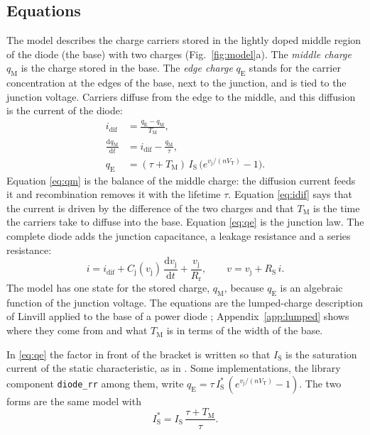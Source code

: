 \documentclass[10pt,a4paper]{scrartcl}
\newcommand{\TM}{T_\mathrm{M}}
\newcommand{\qE}{q_\mathrm{E}}
\newcommand{\qM}{q_\mathrm{M}}
\newcommand{\idif}{i_\mathrm{dif}}
\newcommand{\vj}{v_\mathrm{j}}
\newcommand{\IS}{I_\mathrm{S}}
\newcommand{\RS}{R_\mathrm{S}}
\newcommand{\Rr}{R_\mathrm{r}}
\newcommand{\VT}{V_\mathrm{T}}
\newcommand{\Cj}{C_\mathrm{j}}
\newcommand{\diff}{\mathrm{d}}
\begin{document}
\subsection{Equations}
The model describes the charge carriers stored in the lightly doped middle region of the diode (the base) with two charges (Fig.~\ref{fig:model}a). The \emph{middle charge} $\qM$ is the charge stored in the base. The \emph{edge charge} $\qE$ stands for the carrier concentration at the edges of the base, next to the junction, and is tied to the junction voltage. Carriers diffuse from the edge to the middle, and this diffusion is the current of the diode:
\begin{align}
\idif &= \frac{\qE - \qM}{\TM} , \label{eq:idif}\\
\frac{\diff \qM}{\diff t} &= \idif - \frac{\qM}{\tau} , \label{eq:qm}\\
\qE &= (\tau+\TM)\,\IS\,\bigl(e^{\vj/(n\VT)} - 1\bigr) . \label{eq:qe}
\end{align}
Equation \eqref{eq:qm} is the balance of the middle charge: the diffusion current feeds it and recombination removes it with the lifetime $\tau$. Equation \eqref{eq:idif} says that the current is driven by the difference of the two charges and that $\TM$ is the time the carriers take to diffuse into the base. Equation \eqref{eq:qe} is the junction law. The complete diode adds the junction capacitance, a leakage resistance and a series resistance:
\begin{equation}
i = \idif + \Cj(\vj)\,\frac{\diff \vj}{\diff t} + \frac{\vj}{\Rr} , \qquad v = \vj + \RS\, i .
\label{eq:terminal}
\end{equation}
The model has one state for the stored charge, $\qM$, because $\qE$ is an algebraic function of the junction voltage. The equations are the lumped-charge description of Linvill \cite{linvill1958} applied to the base of a power diode \cite{lauritzen1991}; Appendix~\ref{app:lumped} shows where they come from and what $\TM$ is in terms of the width of the base.

In \eqref{eq:qe} the factor in front of the bracket is written so that $\IS$ is the saturation current of the static characteristic, as in \cite{mathworks}. Some implementations, the library component \texttt{diode\_rr} among them, write $\qE = \tau\,\IS^{*}\,(e^{\vj/(n\VT)}-1)$. The two forms are the same model with
\begin{equation}
\IS^{*} = \IS\,\frac{\tau+\TM}{\tau} .
\label{eq:isstar}
\end{equation}
\end{document}
